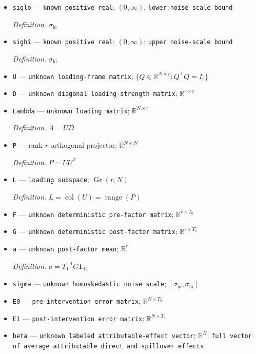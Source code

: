 \documentclass{article}
\begin{document}
\begin{itemize}
  \item \texttt{siglo} --- \texttt{known positive real}; \((0,\infty)\); \texttt{lower noise-\allowbreak{}scale bound}
  \par\smallskip\noindent\emph{Definition.} \(\sigma_{\mathrm{lo}}\)
  \item \texttt{sighi} --- \texttt{known positive real}; \((0,\infty)\); \texttt{upper noise-\allowbreak{}scale bound}
  \par\smallskip\noindent\emph{Definition.} \(\sigma_{\mathrm{hi}}\)
  \item \texttt{U} --- \texttt{unknown loading-\allowbreak{}frame matrix}; \(\{Q\in\mathbb R^{N\times r}:Q^{\top}Q=I_r\}\)
  \item \texttt{D} --- \texttt{unknown diagonal loading-\allowbreak{}strength matrix}; \(\mathbb R^{r\times r}\)
  \item \texttt{Lambda} --- \texttt{unknown loading matrix}; \(\mathbb R^{N\times r}\)
  \par\smallskip\noindent\emph{Definition.} \(\Lambda=UD\)
  \item \texttt{P} --- rank-\(r\) orthogonal projector; \(\mathbb R^{N\times N}\)
  \par\smallskip\noindent\emph{Definition.} \(P=UU^{\top}\)
  \item \texttt{L} --- \texttt{loading subspace}; \(\operatorname{Gr}(r,N)\)
  \par\smallskip\noindent\emph{Definition.} \(L=\operatorname{col}(U)=\operatorname{range}(P)\)
  \item \texttt{F} --- \texttt{unknown deterministic pre-\allowbreak{}factor matrix}; \(\mathbb R^{r\times T_0}\)
  \item \texttt{G} --- \texttt{unknown deterministic post-\allowbreak{}factor matrix}; \(\mathbb R^{r\times T_1}\)
  \item \texttt{a} --- \texttt{unknown post-\allowbreak{}factor mean}; \(\mathbb R^r\)
  \par\smallskip\noindent\emph{Definition.} \(a=T_1^{-1}G\mathbf 1_{T_1}\)
  \item \texttt{sigma} --- \texttt{unknown homoskedastic noise scale}; \([\sigma_{\mathrm{lo}},\sigma_{\mathrm{hi}}]\)
  \item \texttt{E0} --- \texttt{pre-\allowbreak{}intervention error matrix}; \(\mathbb R^{N\times T_0}\)
  \item \texttt{E1} --- \texttt{post-\allowbreak{}intervention error matrix}; \(\mathbb R^{N\times T_1}\)
  \item \texttt{beta} --- \texttt{unknown labeled attributable-\allowbreak{}effect vector}; \(\mathbb R^N\); \texttt{full vector of average attributable direct and spillover effects}

\end{itemize}
\end{document}
